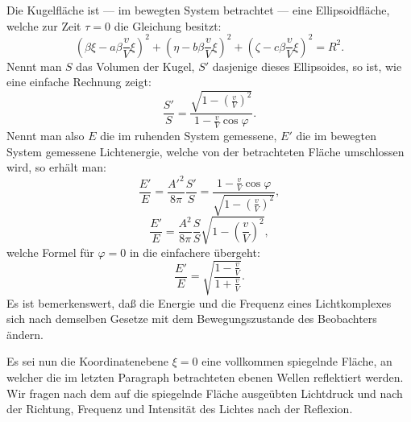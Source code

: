\documentclass[17pt]{webarticle}       %
\begin{document}
Die Kugelfläche ist — im bewegten System betrachtet — eine Ellipsoidfläche, welche zur Zeit \( \tau = 0 \) die Gleichung besitzt:
\[
\left( \beta \xi - a \beta \frac{v}{V} \xi \right)^2 + \left( \eta - b \beta \frac{v}{V} \xi \right)^2 + \left( \zeta - c \beta \frac{v}{V} \xi \right)^2 = R^2.
\]
Nennt man \( S \) das Volumen der Kugel, \( S' \) dasjenige dieses Ellipsoides, so ist, wie eine einfache Rechnung zeigt:
\[
\frac{S'}{S} = \frac{\sqrt{1 - \left( \frac{v}{V} \right)^2}}{1 - \frac{v}{V} \cos \varphi}.
\]
Nennt man also \( E \) die im ruhenden System gemessene, \( E' \) die im bewegten System gemessene Lichtenergie, welche von der betrachteten Fläche umschlossen wird, so erhält man:
\[
\frac{E'}{E} = \frac{A'^2}{8\pi} \frac{S'}{S} = \frac{1 - \frac{v}{V} \cos \varphi}{\sqrt{1 - \left( \frac{v}{V} \right)^2}},
\]
\[
\frac{E'}{E} = \frac{A^2}{8\pi} \frac{S}{S} \sqrt{1 - \left( \frac{v}{V} \right)^2},
\]
welche Formel für \(\varphi = 0\) in die einfachere übergeht:
\[
\frac{E'}{E} = \sqrt{\frac{1 - \frac{v}{V}}{1 + \frac{v}{V}}}.
\]
Es ist bemerkenswert, daß die Energie und die Frequenz eines Lichtkomplexes sich nach demselben Gesetze mit dem Bewegungszustande des Beobachters ändern.

Es sei nun die Koordinatenebene \(\xi = 0\) eine vollkommen spiegelnde Fläche, an welcher die im letzten Paragraph betrachteten ebenen Wellen reflektiert werden. Wir fragen nach dem auf die spiegelnde Fläche ausgeübten Lichtdruck und nach der Richtung, Frequenz und Intensität des Lichtes nach der Reflexion.
\end{document}
